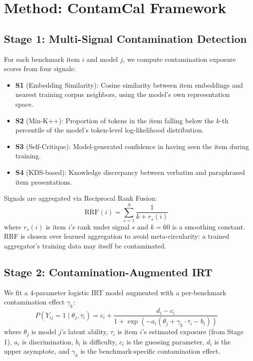 \documentclass[11pt,a4paper]{article}
\begin{document}
\section{Method: ContamCal Framework}

\subsection{Stage 1: Multi-Signal Contamination Detection}

For each benchmark item $i$ and model $j$, we compute contamination exposure scores from four signals:

\begin{itemize}
    \item \textbf{S1} (Embedding Similarity): Cosine similarity between item embeddings and nearest training corpus neighbors, using the model's own representation space.
    \item \textbf{S2} (Min-K++): Proportion of tokens in the item falling below the $k$-th percentile of the model's token-level log-likelihood distribution.
    \item \textbf{S3} (Self-Critique): Model-generated confidence in having seen the item during training.
    \item \textbf{S4} (KDS-based): Knowledge discrepancy between verbatim and paraphrased item presentations.
\end{itemize}

Signals are aggregated via Reciprocal Rank Fusion:
\begin{equation}
    \text{RRF}(i) = \sum_{s=1}^{S} \frac{1}{k + r_s(i)}
\end{equation}
where $r_s(i)$ is item $i$'s rank under signal $s$ and $k=60$ is a smoothing constant. RRF is chosen over learned aggregation to avoid meta-circularity: a trained aggregator's training data may itself be contaminated.

\subsection{Stage 2: Contamination-Augmented IRT}

We fit a 4-parameter logistic IRT model augmented with a per-benchmark contamination effect $\gamma_k$:
\begin{equation}
    P(Y_{ij} = 1 \mid \theta_j, \tau_i) = c_i + \frac{d_i - c_i}{1 + \exp(-a_i(\theta_j + \gamma_k \cdot \tau_i - b_i))}
\end{equation}
where $\theta_j$ is model $j$'s latent ability, $\tau_i$ is item $i$'s estimated exposure (from Stage 1), $a_i$ is discrimination, $b_i$ is difficulty, $c_i$ is the guessing parameter, $d_i$ is the upper asymptote, and $\gamma_k$ is the benchmark-specific contamination effect.
\end{document}

